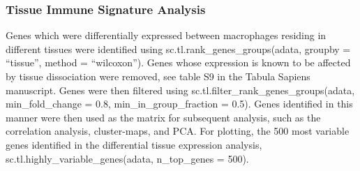 \subsubsection{Tissue Immune Signature Analysis}
Genes which were differentially expressed between macrophages residing in different tissues
were identified using sc.tl.rank_genes_groups(adata, groupby = ``tissue”, method = ``wilcoxon”).
Genes whose expression is known to be affected by tissue dissociation were removed, see table S9 in the Tabula Sapiens manuscript\cite{tabula_sapiens_consortium_tabula_2022}. Genes were then filtered using sc.tl.filter_rank_genes_groups(adata, min_fold_change = 0.8, min_in_group_fraction = 0.5). Genes identified in this manner were then
used as the matrix for subsequent analysis, such as the correlation analysis, cluster-maps, and
PCA. For plotting, the 500 most variable genes identified in the differential tissue expression
analysis, sc.tl.highly_variable_genes(adata, n_top_genes = 500).